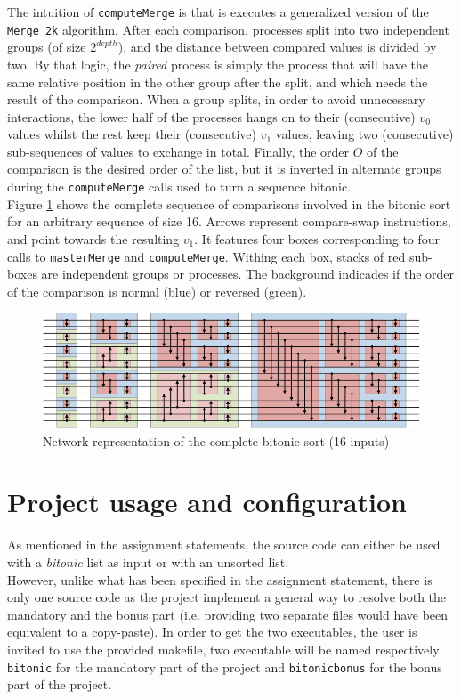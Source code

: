 \documentclass[a4paper,11pt]{article}
\begin{document}
  \noindent The intuition of \texttt{computeMerge} is that is executes a generalized version of the \texttt{Merge 2k} algorithm. After each comparison, processes split into two independent groups (of size $2^{depth}$), and the distance between compared values is divided by two. By that logic, the \textit{paired} process is simply the process that will have the same relative position in the other group after the split, and which needs the result of the comparison. When a group splits, in order to avoid unnecessary interactions, the lower half of the processes hangs on to their (consecutive) $v_0$ values whilst the rest keep their (consecutive) $v_1$ values, leaving two (consecutive) sub-sequences of values to exchange in total. Finally, the order $O$ of the comparison is the desired order of the list, but it is inverted in alternate groups during the \texttt{computeMerge} calls used to turn a sequence bitonic.\\
  
  \noindent Figure \ref{fig:bitonic_wiki} shows the complete sequence of comparisons involved in the bitonic sort for an arbitrary sequence of size 16. Arrows represent compare-swap instructions, and point towards the resulting $v_1$. It features four boxes corresponding to four calls to \texttt{masterMerge} and \texttt{computeMerge}. Withing each box, stacks of red sub-boxes are independent groups or processes. The background indicades if the order of the comparison is normal (blue) or reversed (green).

\begin{figure}[!h]
  \centering
  \includegraphics[width=\textwidth]{img/bitonic.png}
  \caption{Network representation of the complete bitonic sort (16 inputs)}
  \label{fig:bitonic_wiki}
\end{figure}


\section{Project usage and configuration}\label{usage}

  As mentioned in the assignment statements, the source code can either be used with a \textit{bitonic} list as input or with an unsorted list.\\
  However, unlike what has been specified in the assignment statement, there is only one source code as the project implement a general way to resolve both the mandatory and the bonus part (i.e. providing two separate files would have been equivalent to a copy-paste). In order to get the two executables, the user is invited to use the provided makefile, two executable will be named respectively \verb|bitonic| for the mandatory part of the project and \verb|bitonicbonus| for the bonus part of the project.
\end{document}
